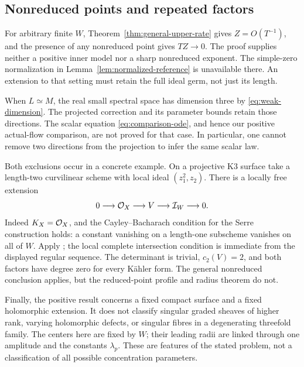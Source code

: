 \subsection{Nonreduced points and repeated factors}

For arbitrary finite \(W\), Theorem~\ref{thm:general-upper-rate}
gives \(Z=O(T^{-1})\), and the presence of any nonreduced
point gives \(TZ\to0\). The proof supplies neither a
positive inner model nor a sharp nonreduced exponent.
The simple-zero normalization in
Lemma~\ref{lem:normalized-reference} is unavailable
there. An extension to that setting must retain
the full ideal germ, not just its length.

When \(L\simeq M\), the real small spectral space
has dimension three by \eqref{eq:weak-dimension}.
The projected correction and its parameter bounds
retain those directions. The scalar equation
\eqref{eq:comparison-ode}, and hence our positive
actual-flow comparison, are not proved for that case.
In particular, one cannot remove two directions
from the projection to infer the same scalar law.

Both exclusions occur in a concrete example. On a
projective K3 surface take a length-two curvilinear
scheme with local ideal \((z_1^2,z_2)\).
There is a locally free extension
\[
 0\longrightarrow\mathcal O_X\longrightarrow V
                  \longrightarrow\mathcal I_W\longrightarrow0.
\]
Indeed \(K_X=\mathcal O_X\), and the Cayley--Bacharach
condition for the Serre construction holds: a constant
vanishing on a length-one subscheme vanishes on all
of \(W\). Apply \cite[Theorem~5.1.1]{HuybrechtsLehn97};
the local complete intersection condition is immediate
from the displayed regular sequence. The determinant
is trivial, \(c_2(V)=2\), and both factors have degree
zero for every Kähler form. The general nonreduced
conclusion applies, but the reduced-point profile
and radius theorem do not.

Finally, the positive result concerns a fixed compact surface
and a fixed holomorphic extension. It does not classify
singular graded sheaves of higher rank, varying holomorphic
defects, or singular fibres in a degenerating threefold family.
The centers here are fixed by \(W\); their leading radii
are linked through one amplitude and the constants
\(\lambda_p\). These are features of the stated problem,
not a classification of all possible concentration parameters.
